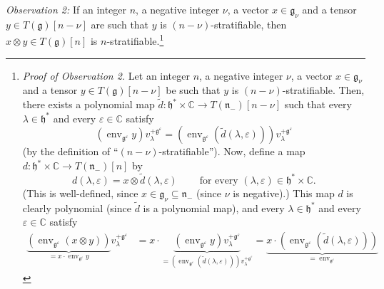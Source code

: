 \documentclass[etingof-lie.tex]{subfiles}
\begin{document}
\textit{Observation 2:} If an integer $n$, a negative integer $\nu$, a vector
$x\in\mathfrak{g}_{\nu}$ and a tensor $y\in T\left(  \mathfrak{g}\right)
\left[  n-\nu\right]  $ are such that $y$ is $\left(  n-\nu\right)
$-stratifiable, then $x\otimes y\in T\left(  \mathfrak{g}\right)  \left[
n\right]  $ is $n$-stratifiable.\footnote{\textit{Proof of Observation 2.} Let
an integer $n$, a negative integer $\nu$, a vector $x\in\mathfrak{g}_{\nu}$
and a tensor $y\in T\left(  \mathfrak{g}\right)  \left[  n-\nu\right]  $ be
such that $y$ is $\left(  n-\nu\right)  $-stratifiable. Then, there exists a
polynomial map $\widetilde{d}:\mathfrak{h}^{\ast}\times\mathbb{C}\rightarrow
T\left(  \mathfrak{n}_{-}\right)  \left[  n-\nu\right]  $ such that every
$\lambda\in\mathfrak{h}^{\ast}$ and every $\varepsilon\in\mathbb{C}$ satisfy%
\[
\left(  \operatorname*{env}\nolimits_{\mathfrak{g}^{\varepsilon}}y\right)
v_{\lambda}^{+\mathfrak{g}^{\varepsilon}}=\left(  \operatorname*{env}%
\nolimits_{\mathfrak{g}^{\varepsilon}}\left(  \widetilde{d}\left(
\lambda,\varepsilon\right)  \right)  \right)  v_{\lambda}^{+\mathfrak{g}%
^{\varepsilon}}%
\]
(by the definition of ``$\left(  n-\nu\right)  $-stratifiable''). Now, define
a map $d:\mathfrak{h}^{\ast}\times\mathbb{C}\rightarrow T\left(
\mathfrak{n}_{-}\right)  \left[  n\right]  $ by
\[
d\left(  \lambda,\varepsilon\right)  =x\otimes\widetilde{d}\left(
\lambda,\varepsilon\right)  \ \ \ \ \ \ \ \ \ \ \text{for every }\left(
\lambda,\varepsilon\right)  \in\mathfrak{h}^{\ast}\times\mathbb{C}.
\]
(This is well-defined, since $x\in\mathfrak{g}_{\nu}\subseteq\mathfrak{n}_{-}$
(since $\nu$ is negative).) This map $d$ is clearly polynomial (since
$\widetilde{d}$ is a polynomial map), and every $\lambda\in\mathfrak{h}^{\ast
}$ and every $\varepsilon\in\mathbb{C}$ satisfy%
\begin{align*}
\underbrace{\left(  \operatorname*{env}\nolimits_{\mathfrak{g}^{\varepsilon}%
}\left(  x\otimes y\right)  \right)  }_{=x\cdot\operatorname*{env}%
\nolimits_{\mathfrak{g}^{\varepsilon}}y}v_{\lambda}^{+\mathfrak{g}%
^{\varepsilon}}  &  =x\cdot\underbrace{\left(  \operatorname*{env}%
\nolimits_{\mathfrak{g}^{\varepsilon}}y\right)  v_{\lambda}^{+\mathfrak{g}%
^{\varepsilon}}}_{=\left(  \operatorname*{env}\nolimits_{\mathfrak{g}%
^{\varepsilon}}\left(  \widetilde{d}\left(  \lambda,\varepsilon\right)
\right)  \right)  v_{\lambda}^{+\mathfrak{g}^{\varepsilon}}}%
=\underbrace{x\cdot\left(  \operatorname*{env}\nolimits_{\mathfrak{g}%
^{\varepsilon}}\left(  \widetilde{d}\left(  \lambda,\varepsilon\right)
\right)  \right)  }_{=\operatorname*{env}\nolimits_{\mathfrak{g}^{\varepsilon
}}}
\end{align*}}
\end{document}
